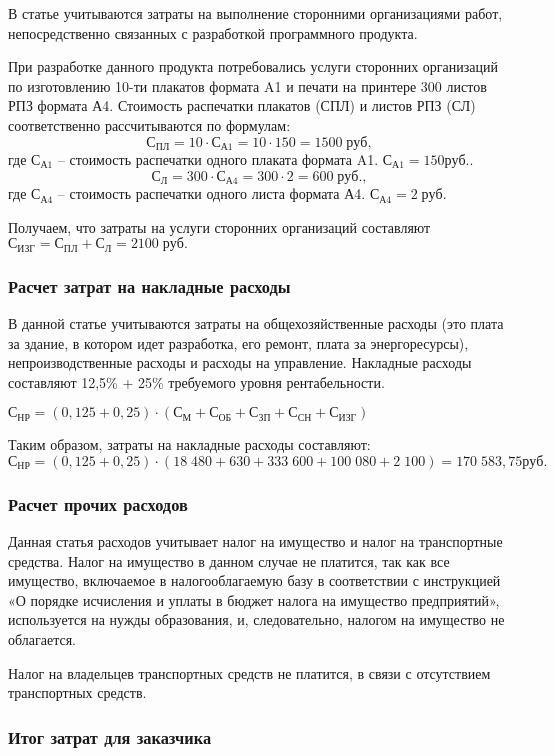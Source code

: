 В статье учитываются затраты на выполнение сторонними организациями работ, непосредственно связанных с разработкой программного продукта.

При разработке данного продукта потребовались услуги сторонних организаций по изготовлению 10-ти плакатов формата A1 и печати на принтере 300 листов РПЗ формата А4.  Стоимость распечатки плакатов  (СПЛ) и листов РПЗ (СЛ) соответственно  рассчитываются  по формулам:
$$С_{ПЛ} =10 \cdot С_{А1} = 10 \cdot 150 = 1500 \; руб,$$
где $С_{А1}$ – стоимость распечатки одного плаката формата A1.   $С_{А1}  = 150 руб.$.
$$С_Л =300 \cdot С_{А4} = 300 \cdot 2 = 600 \; руб.,$$
где $С_{А4}$ – стоимость распечатки одного листа  формата А4. $С_{А4}  = 2 \; руб.$

Получаем, что затраты на услуги сторонних организаций составляют
$С_{ИЗГ}= С_{ПЛ} + С_Л = 2100 \; руб.$

\subsubsection{Расчет затрат на накладные расходы}
В данной статье учитываются затраты на общехозяйственные расходы (это плата за здание, в котором идет разработка, его ремонт, плата за энергоресурсы), непроизводственные расходы и расходы на управление.
Накладные расходы составляют 12,5\% + 25\% требуемого уровня рентабельности.
 
$С_{НР}  =(0,125+0,25) \cdot (С_М + С_{ОБ} + С_{ЗП} + С_{СН} + С_{ИЗГ})$

Таким образом,  затраты на накладные расходы составляют:  
$С_{НР}  = (0,125+0,25) \cdot (18 \; 480+ 630 + 333 \; 600+ 100 \; 080 + 2 \; 100) =170 \; 583,75 руб.$

\subsubsection{Расчет прочих расходов}

Данная статья расходов учитывает налог на имущество и налог на транспортные средства. Налог на имущество в данном случае не платится, так как  все имущество, включаемое в налогооблагаемую базу в соответствии с инструкцией «О порядке исчисления и уплаты в бюджет налога на имущество предприятий», используется на нужды образования, и, следовательно, налогом на имущество не облагается.

Налог на владельцев транспортных средств не платится, в связи с отсутствием транспортных средств. 

\subsubsection{Итог затрат для заказчика}

